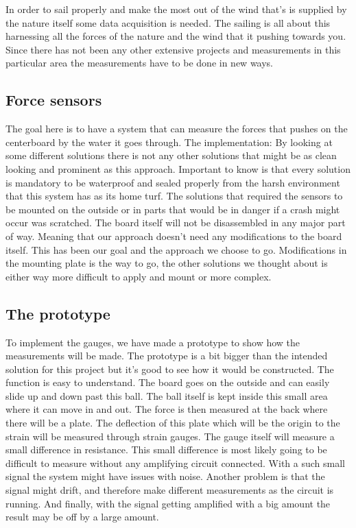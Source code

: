 
In order to sail properly and make the most out of the wind that’s is supplied by the nature itself some data acquisition is needed. The sailing is all about this harnessing all the forces of the nature and the wind that it pushing towards you. Since there has not been any other extensive projects and measurements in this particular area the measurements have to be done in new ways. 

\subsection{Force sensors}

The goal here is to have a system that can measure the forces that pushes on the centerboard by the water it goes through. 
The implementation:
By looking at some different solutions there is not any other solutions that might be as clean looking and prominent as this approach. Important to know is that every solution is mandatory to be waterproof and sealed properly from the harsh environment that this system has as its home turf. The solutions that required the sensors to be mounted on the outside or in parts that would be in danger if a crash might occur was scratched.  
The board itself will not be disassembled in any major part of way. Meaning that our approach doesn’t need any modifications to the board itself. This has been our goal and the approach we choose to go. Modifications in the mounting plate is the way to go, the other solutions we thought about is either way more difficult to apply and mount or more complex.

\subsection{The prototype}
To implement the gauges, we have made a prototype to show how the measurements will be made. The prototype is a bit bigger than the intended solution for this project but it's good to see how it would be constructed. The function is easy to understand. The board goes on the outside and can easily slide up and down past this ball.  The ball itself is kept inside this small area where it can move in and out. The force is then measured at the back where there will be a plate. The deflection of this plate which will be the origin to the strain will be measured through strain gauges. 
The gauge itself will measure a small difference in resistance. This small difference is most likely going to be difficult to measure without any amplifying circuit connected. With a such small signal the system might have issues with noise. Another problem is that the signal might drift, and therefore make different measurements as the circuit is running. And finally, with the signal getting amplified with a big amount the result may be off by a large amount.
 
